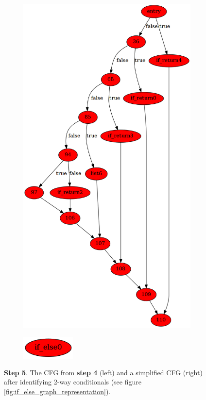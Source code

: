 \begin{figure}[htbp]
	\centering
	\begin{subfigure}[ht]{0.45\textwidth}
		\includegraphics[width=\textwidth]{inc/appendices/control_flow_analysis_example/step5_before.png}
	\end{subfigure}
	\qquad
	\begin{subfigure}[ht]{0.45\textwidth}
		\centering
		\includegraphics[width=0.3\textwidth]{inc/appendices/control_flow_analysis_example/step5_after.png}
	\end{subfigure}
	\caption{\textbf{Step 5}. The CFG from \textbf{step 4} (left) and a simplified CFG (right) after identifying 2-way conditionals (see figure \ref{fig:if_else_graph_representation}).}
	\label{fig:step_5}
\end{figure}
